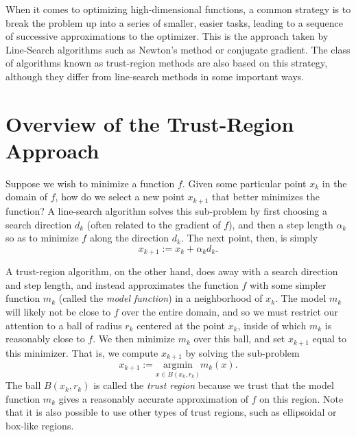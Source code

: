 \label{lab:trust_region}


When it comes to optimizing high-dimensional functions, a common strategy is to break
the problem up into a series of smaller, easier tasks, leading to a sequence of
successive approximations to the optimizer. This is the approach taken by Line-Search
algorithms such as Newton's method or conjugate gradient.
The class of algorithms known as trust-region methods are also based on this
strategy, although they differ from line-search methods in some important ways.

\section*{Overview of the Trust-Region Approach}
Suppose we wish to minimize a function $f$.
Given some particular point $x_k$ in the domain of $f$, how do we
select a new point $x_{k+1}$ that better minimizes the function? A line-search
algorithm solves this sub-problem by first choosing a search direction $d_k$
(often related to the gradient of $f$), and then a step length $\alpha_k$ so
as to minimize $f$ along the direction $d_k$. The next point, then, is simply
\[
x_{k+1} := x_k + \alpha_k d_k.
\]

A trust-region algorithm, on the other hand, does away with a search direction and
step length, and instead approximates the function $f$ with some simpler function
$m_k$ (called the \emph{model function}) in a neighborhood of $x_k$.
The model $m_k$ will likely not be close to $f$ over the entire
domain, and so we must restrict our attention to a ball of radius $r_k$ centered at
the point $x_k$, inside of which $m_k$ is reasonably close to $f$. We then minimize
$m_k$ over this ball, and set $x_{k+1}$ equal to this minimizer. That is, we compute $x_{k+1}$ by
solving the sub-problem
\[
x_{k+1} := \underset{x \in B(x_k, r_k)}{\text{argmin}} m_k(x).
\]
The ball $B(x_k, r_k)$ is called the \emph{trust region} because we trust that the
model function $m_k$ gives a reasonably accurate approximation of $f$ on this region.
Note that it is also possible to use other types of trust regions, such as
ellipsoidal or box-like regions.

